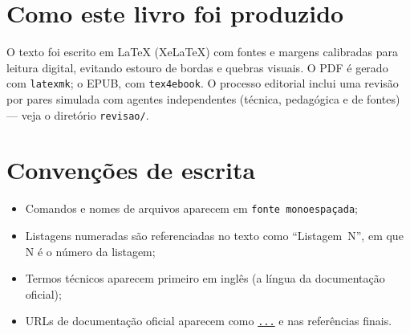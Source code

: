 \section*{Como este livro foi produzido}
O texto foi escrito em \LaTeX{} (XeLaTeX) com fontes e margens calibradas para
leitura digital, evitando estouro de bordas e quebras visuais. O PDF é gerado
com \texttt{latexmk}; o EPUB, com \texttt{tex4ebook}. O processo editorial
inclui uma revisão por pares simulada com agentes independentes (técnica,
pedagógica e de fontes) — veja o diretório \texttt{revisao/}.

\section*{Convenções de escrita}
\begin{itemize}[leftmargin=*, itemsep=0.3em]
  \item Comandos e nomes de arquivos aparecem em \texttt{fonte monoespaçada};
  \item Listagens numeradas são referenciadas no texto como ``Listagem~N'', em que N é o número da listagem;
  \item Termos técnicos aparecem primeiro em inglês (a língua da documentação oficial);
  \item URLs de documentação oficial aparecem como \texttt{\url{...}} e nas referências finais.
\end{itemize}

\clearpage
